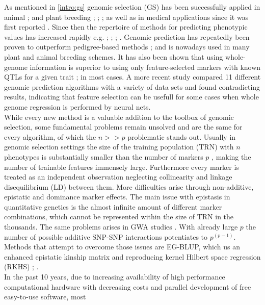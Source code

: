 As mentioned in \ref{intro:gs} genomic selection (GS) has been successfully applied in
animal \cite{hayes2010genome}; \cite{gianola2015one} and plant breeding \cite{crossa2010};
\cite{heffner2010plant}; \cite{desta2014genomic}; \cite{crossa2017} as well as in medical
applications since it was first reported \cite{hayes2001}. Since then the repertoire of
methods for predicting phenotypic values has increased rapidly e.g. \cite{dlc2009};
\cite{habier2011}; \cite{gianola2013}; \cite{crossa2017}. Genomic prediction has
repeatedly been proven to outperform pedigree-based methods \cite{crossa2010};
\cite{albrecht2011} and is nowadays used in many plant and animal breeding schemes. It has
also been shown that using whole-genome information is superior to using only
feature-selected markers with known QTLs for a given trait \cite{bernardo2007};
\cite{heffner2011} in most cases. A more recent study \cite{azodi2019} compared 11
different genomic prediction algorithms with a variety of data sets and found
contradicting results, indicating that feature selection can be usefull for some cases
when whole genome regression is performed by neural nets. \\
While every new method is a valuable addition to the toolbox of genomic selection, some
fundamental problems remain unsolved and are the same for every algorithm, of which the
$n>>p$ problematic stands out. Usually in genomic selection settings the size of the
training population (TRN) with $n$ phenotypes is substantially smaller than the number of
markers $p$ \cite{fan2014challenges}, making the number of trainable features immensely
large. Furthermore every marker is treated as an independent observation neglecting
collinearity and linkage disequilibrium (LD) between them. More difficulties arise through
non-additive, epistatic and dominance marker effects. The main issue with epistasis in
quantitative genetics is the almost infinite amount of different marker combinations,
which cannot be represented within the size of TRN in the thousands. The same problems
arises in GWA studies \cite{korte2013advantages}. With already large $p$ the number of
possible additive SNP-SNP interactions potentiates to $p^{(p-1)}$. Methods that attempt to
overcome those issues are EG-BLUP, which us an enhanced epistatic kinship matrix and
reproducing kernel Hilbert space regression (RKHS) \cite{jiang2015}; \cite{martini2017genomic}. \\
In the past 10 years, due to increasing availability of high performance computational
hardware with decreasing costs and parallel development of free easy-to-use software, most
